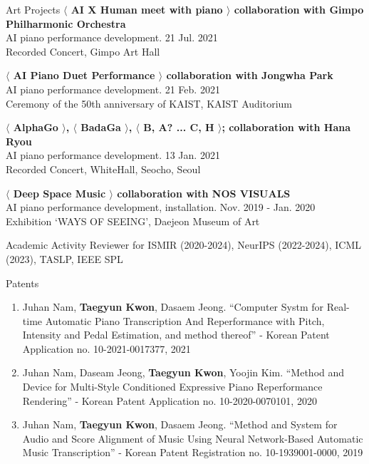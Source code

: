 \documentclass{resume} %
\begin{document}
\begin{rSection}{Art Projects}
{\bf $\langle$ AI X Human meet with piano $\rangle$ collaboration with Gimpo Philharmonic Orchestra}\\
AI piano performance development. \hfill {21 Jul. 2021}\\
Recorded Concert, Gimpo Art Hall

{\bf $\langle$ AI Piano Duet Performance $\rangle$ collaboration with Jongwha Park}\\
AI piano performance development. \hfill {21 Feb. 2021}\\
Ceremony of the 50th anniversary of KAIST, KAIST Auditorium

{\bf $\langle$ AlphaGo $\rangle$, $\langle$ BadaGa $\rangle$,  $\langle$ B, A? ... C, H $\rangle$; collaboration with Hana Ryou}\\
AI piano performance development. \hfill {13 Jan. 2021}\\
Recorded Concert, WhiteHall, Seocho, Seoul

{\bf $\langle$ Deep Space Music $\rangle$ collaboration with NOS VISUALS}\\
AI piano performance development, installation. \hfill {Nov. 2019 - Jan. 2020}\\
Exhibition `WAYS OF SEEING', Daejeon Museum of Art

\end{rSection}

\begin{rSection}{Academic Activity}
{Reviewer for ISMIR (2020-2024), NeurIPS (2022-2024), ICML (2023), TASLP, IEEE SPL}

\end{rSection}



\begin{rSection}{Patents}
\begin{enumerate}
    \item Juhan Nam, {\bf Taegyun Kwon}, Dasaem Jeong. ``Computer Systm for Real-time Automatic Piano Transcription And Reperformance with Pitch, Intensity and Pedal Estimation, and method thereof'' - Korean Patent Application no. 10-2021-0017377, 2021
    \item Juhan Nam, Daseam Jeong, {\bf Taegyun Kwon}, Yoojin Kim. ``Method and Device for Multi-Style Conditioned Expressive Piano Reperformance Rendering'' -  Korean Patent Application no. 10-2020-0070101, 2020
    \item Juhan Nam, {\bf Taegyun Kwon}, Dasaem Jeong. ``Method and System for Audio and Score Alignment of Music Using Neural Network-Based Automatic Music Transcription'' -
     Korean Patent Registration no. 10-1939001-0000, 2019
\end{enumerate}
\end{rSection}

\newpage
\end{document}
